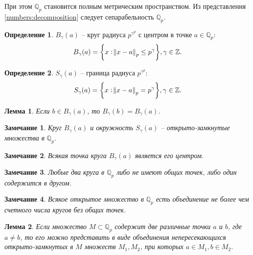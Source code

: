 \documentclass[master, och, diploma, times]{sty/SCWorks}
\theoremstyle{plain}
\newtheorem{lemma}{Лемма}[section]
\newtheorem{note}{Замечание}[section]
\theoremstyle{definition}
\newtheorem{defn}{Определение}[section]
\numberwithin{equation}{section}
\begin{document}
\noindent При этом $\mathbb {Q}_p$ становится полным метрическим пространством. Из представления \eqref{numbers:decomposition} следует сепарабельность $\mathbb {Q}_p$.

\begin{defn}
$B_{\gamma}(a)$ -- круг радиуса $p^{\gamma^p}$ с центром в точке $a \in \mathbb {Q}_p$:
\begin{equation}
	B_\gamma(a) = \bigg\{x: \norm{x-a}_p \le p^{\gamma} \bigg\}, \gamma \in \mathbb {Z}.
\end{equation}
\end{defn}

\begin{defn}
$S_{\gamma}(a)$ -- граница радиуса $p^{\gamma^p}$:
\begin{equation}
	S_\gamma(a) = \bigg\{x: \norm{x-a}_p = p^{\gamma} \bigg\}, \gamma \in \mathbb {Z}.
\end{equation}
\end{defn}

\begin{lemma}
Если $b \in B_{\gamma}(a)$, то $B_{\gamma}(b)=B_{\gamma}(a)$.
\end{lemma}

\begin{note}
Круг $B_{\gamma}(a)$ и окружность $S_{\gamma}(a)$ -- открыто-замкнутые множества в $\mathbb {Q}_p$.
\end{note}

\begin{note}
Всякая точка круга $B_{\gamma}(a)$ является его центром.
\end{note}

\begin{note}
Любые два круга в $\mathbb {Q}_p$ либо не имеют общих точек, либо один содержится в другом.
\end{note}

\begin{note}
Всякое открытое множество в $\mathbb {Q}_p$ есть объединение не более чем счетного числа кругов без общих точек.
\end{note}

\begin{lemma} \label{lemma:2}
Если множество $M \subset \mathbb {Q}_p$ содержит две различные точки $a$ и $b$, где $a \ne b$, то его можно представить в виде объединения непересекающихся открыто-замкнутых в $M$ множеств $M_1, M_2$, при которых $a \in M_1, b \in M_2$\cite{bib:kozirev:2008}.
\end{lemma}
\end{document}
